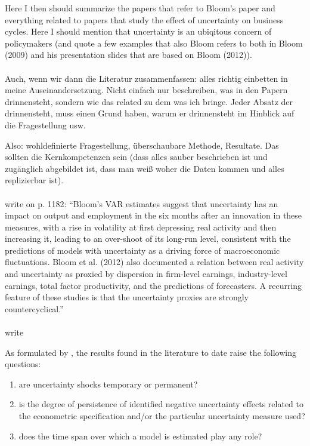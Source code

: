 \documentclass[a4paper,12pt,oneside,pointednumbers,bibtotoc,bigheadings,liststotoc]{scrbook}
\begin{document}
Here I then should summarize the papers that refer to Bloom's paper and everything related to papers that study the effect of uncertainty on business cycles.
Here I should mention that uncertainty is an ubiqitous concern of policymakers (and quote a few examples that also Bloom refers to both in Bloom (2009) and his presentation slides that are based on Bloom (2012)).\\
\\
Auch, wenn wir dann die Literatur zusammenfassen: alles richtig einbetten in meine Auseinandersetzung. Nicht einfach nur beschreiben, was in den Papern drinnensteht, sondern wie das related zu dem was ich bringe. Jeder Absatz der drinnensteht, muss einen Grund haben, warum er drinnensteht im Hinblick auf die Fragestellung usw. 

Also: wohldefinierte Fragestellung, überschaubare Methode, Resultate. Das sollten die Kernkompetenzen sein (dass alles sauber beschrieben ist und zugänglich abgebildet ist, dass man weiß woher die Daten kommen und alles replizierbar ist).
\\
\\
\citet{juradoetal:15} write on p. 1182: ``Bloom's VAR estimates suggest that uncertainty has an impact on output and employment in the six months after an innovation in these measures, with a rise in volatility at first depressing real activity and then increasing it, leading to an over-shoot of its long-run level, consistent with the predictions of models with uncertainty as a driving force of macroeconomic fluctuations. Bloom et al. (2012) also documented a relation between real activity and uncertainty as proxied by dispersion in firm-level earnings, industry-level earnings, total factor productivity, and the predictions of forecasters. A recurring feature of these studies is that the uncertainty proxies are strongly countercyclical.''
\\
\\
\citet{orlikandveldkamp:14} write

As formulated by \citet[p. 24]{bontempietal:16}, the results found in the literature to date raise the following questions:
\begin{enumerate}
	\item are uncertainty shocks temporary or permanent?
	\item is the degree of persistence of identified negative uncertainty effects related to the econometric specification and/or the particular uncertainty measure used?
	\item does the time span over which a model is estimated play any role?
\end{enumerate}
\end{document}
